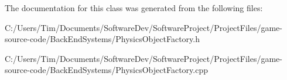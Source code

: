 The documentation for this class was generated from the following files\+:\begin{DoxyCompactItemize}
\item 
C\+:/\+Users/\+Tim/\+Documents/\+Software\+Dev/\+Software\+Project/\+Project\+Files/game-\/source-\/code/\+Back\+End\+Systems/Physics\+Object\+Factory.\+h\item 
C\+:/\+Users/\+Tim/\+Documents/\+Software\+Dev/\+Software\+Project/\+Project\+Files/game-\/source-\/code/\+Back\+End\+Systems/Physics\+Object\+Factory.\+cpp\end{DoxyCompactItemize}
